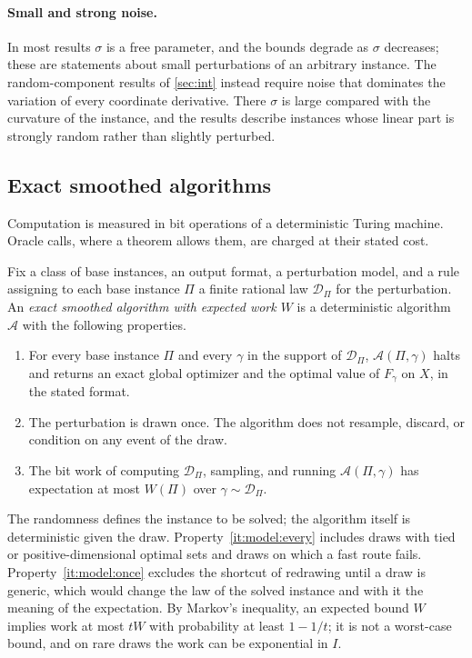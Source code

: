 \paragraph{Small and strong noise.}
In most results $\sigma$ is a free parameter, and the bounds degrade as
$\sigma$ decreases; these are statements about small perturbations of an
arbitrary instance. The random-component results of \cref{sec:int} instead
require noise that dominates the variation of every coordinate derivative.
There $\sigma$ is large compared with the curvature of the instance, and the
results describe instances whose linear part is strongly random rather than
slightly perturbed.

\subsection{Exact smoothed algorithms}\label{sec:model:algorithms}

Computation is measured in bit operations of a deterministic Turing
machine. Oracle calls, where a theorem allows them, are charged at their
stated cost.

\begin{definition}\label{def:model:algorithm}
Fix a class of base instances, an output format, a perturbation model, and a
rule assigning to each base instance $\Pi$ a finite rational law
$\mathcal D_\Pi$ for the perturbation. An \emph{exact smoothed algorithm with
expected work $W$} is a deterministic algorithm $\mathcal A$ with the
following properties.
\begin{enumerate}[label=(\roman*)]
\item\label{it:model:every} For every base instance $\Pi$ and every $\gamma$
in the support of $\mathcal D_\Pi$, $\mathcal A(\Pi,\gamma)$ halts and
returns an exact global optimizer and the optimal value of $F_\gamma$ on $X$,
in the stated format.
\item\label{it:model:once} The perturbation is drawn once. The algorithm
does not resample, discard, or condition on any event of the draw.
\item\label{it:model:expect} The bit work of computing $\mathcal D_\Pi$,
sampling, and running $\mathcal A(\Pi,\gamma)$ has expectation at most
$W(\Pi)$ over $\gamma\sim\mathcal D_\Pi$.
\end{enumerate}
\end{definition}

The randomness defines the instance to be solved; the algorithm itself is
deterministic given the draw. Property~\ref{it:model:every} includes draws
with tied or positive-dimensional optimal sets and draws on which a fast
route fails. Property~\ref{it:model:once} excludes the shortcut of redrawing
until a draw is generic, which would change the law of the solved instance
and with it the meaning of the expectation. By Markov's inequality, an
expected bound $W$ implies work at most $tW$ with probability at least
$1-1/t$; it is not a worst-case bound, and on rare draws the work can be
exponential in $I$.

